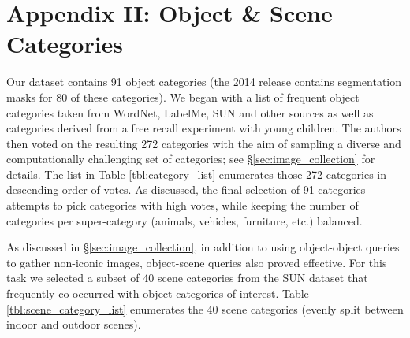 \section*{Appendix II: Object \& Scene Categories}

Our dataset contains 91 object categories (the 2014 release contains segmentation masks for 80 of these categories). We began with a list of frequent object categories taken from WordNet, LabelMe, SUN and other sources as well as categories derived from a free recall experiment with young children. The authors then voted on the resulting 272 categories with the aim of sampling a diverse and computationally challenging set of categories; see \S\ref{sec:image_collection} for details. The list in Table \ref{tbl:category_list} enumerates those 272 categories in descending order of votes. As discussed, the final selection of 91 categories attempts to pick categories with high votes, while keeping the number of categories per super-category (animals, vehicles, furniture, etc.) balanced.

As discussed in \S\ref{sec:image_collection}, in addition to using object-object queries to gather non-iconic images, object-scene queries also proved effective. For this task we selected a subset of 40 scene categories from the SUN dataset that frequently co-occurred with object categories of interest. Table \ref{tbl:scene_category_list} enumerates the 40 scene categories (evenly split between indoor and outdoor scenes).


